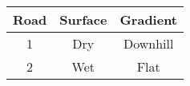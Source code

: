 \begin{tabular}{|c|c|c|}
    \hline
    Road & Surface & Gradient \\ \hline
    1    & Dry     & Downhill \\ \hline
    2    & Wet     & Flat     \\ \hline
\end{tabular}